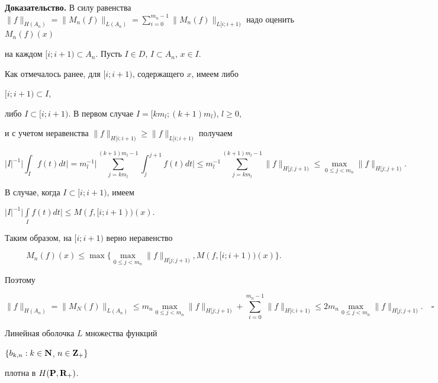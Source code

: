 {\bf Доказательство.} В силу равенства $\|f\|_{H(A_n)}=\|M_n(f)\|_{L(A_n)}


=\sum\limits^{m_n-1}_{i=0}\|M_n(f)\|_{L[i;i+1)}$ надо оценить $M_n(f)(x)$ 


на каждом $[i;i+1)\subset A_n$. Пусть $I\in D$, $I\subset A_n$, $x\in I$. 


Как отмечалось ранее, для $[i;i+1)$, содержащего $x$, имеем либо


$[i;i+1)\subset I$,


либо $I\subset [i;i+1)$. В первом случае $I=[km_l;(k+1)m_l)$, $l\geq 0$,


и с учетом неравенства $\|f\|_{H[i;i+1)}\geq \|f\|_{L[i;i+1)}$ получаем


$$


|I|^{-1}\bigg|\int_If(t)dt\bigg|=m_l^{-1}\bigg|\sum^{(k+1)m_l-1}_{j=km_l}


\int^{j+1}_jf(t)dt\bigg|\leq


m_l^{-1}\sum^{(k+1)m_l-1}_{j=km_l}\|f\|_{H[j;j+1)}\leq


\max_{0\leq j<m_n}\|f\|_{H[j;j+1)}.


$$


В случае, когда $I\subset [i;i+1)$, имеем


$|I|^{-1}\Big|\int\limits_If(t)dt\Big|\leq M(f,[i;i+1))(x)$. 


Таким образом, на $[i;i+1)$ верно неравенство


$$


M_n(f)(x)\leq \max\{\max_{0\leq j<m_n}\|f\|_{H[j;j+1)},M(f,[i;i+1))(x)\}.


$$


Поэтому


$$


\|f\|_{H(A_n)}=\|M_N(f)\|_{L(A_n)}\leq m_n\max_{0\leq j<m_n}\|f\|_{H[j;j+1)}


+\sum_{i=0}^{m_n-1}\|f\|_{H[i;i+1)}\leq 2m_n\max_{0\leq j<m_n}\|f\|_{H[j;j+1)}.


\quad\square


$$








\begin{lems}


Линейная оболочка $L$ множества функций


$\{b_{k,n}: k\in {\bold N}$, $n\in {\bold Z}_+\}$ 


плотна в $H({\bold P},{\bold R}_+)$.


\end{lems}








